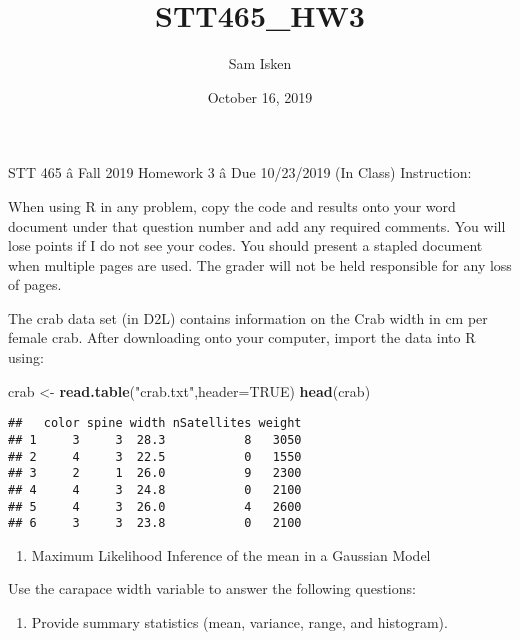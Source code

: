 \documentclass[]{article}
\title{STT465\_HW3}
\author{Sam Isken}
\date{October 16, 2019}
\newenvironment{Shaded}{\begin{snugshade}}{\end{snugshade}}
\newcommand{\KeywordTok}[1]{\textcolor[rgb]{0.13,0.29,0.53}{\textbf{#1}}}
\newcommand{\DataTypeTok}[1]{\textcolor[rgb]{0.13,0.29,0.53}{#1}}
\newcommand{\StringTok}[1]{\textcolor[rgb]{0.31,0.60,0.02}{#1}}
\newcommand{\OtherTok}[1]{\textcolor[rgb]{0.56,0.35,0.01}{#1}}
\newcommand{\NormalTok}[1]{#1}
\providecommand{\tightlist}{%
  \setlength{\itemsep}{0pt}\setlength{\parskip}{0pt}}
\begin{document}
\maketitle

STT 465 â Fall 2019 Homework 3 â Due 10/23/2019 (In Class)
Instruction:

When using R in any problem, copy the code and results onto your word
document under that question number and add any required comments. You
will lose points if I do not see your codes. You should present a
stapled document when multiple pages are used. The grader will not be
held responsible for any loss of pages.

The crab data set (in D2L) contains information on the Crab width in cm
per female crab. After downloading onto your computer, import the data
into R using:

\begin{Shaded}
\begin{Highlighting}[]
\NormalTok{crab <-}\StringTok{ }\KeywordTok{read.table}\NormalTok{(}\StringTok{"crab.txt"}\NormalTok{,}\DataTypeTok{header=}\OtherTok{TRUE}\NormalTok{)}
\KeywordTok{head}\NormalTok{(crab)}
\end{Highlighting}
\end{Shaded}

\begin{verbatim}
##   color spine width nSatellites weight
## 1     3     3  28.3           8   3050
## 2     4     3  22.5           0   1550
## 3     2     1  26.0           9   2300
## 4     4     3  24.8           0   2100
## 5     4     3  26.0           4   2600
## 6     3     3  23.8           0   2100
\end{verbatim}

\begin{enumerate}
\def\labelenumi{\arabic{enumi}.}
\tightlist
\item
  Maximum Likelihood Inference of the mean in a Gaussian Model
\end{enumerate}

Use the carapace width variable to answer the following questions:

\begin{enumerate}
\def\labelenumi{\alph{enumi})}
\tightlist
\item
  Provide summary statistics (mean, variance, range, and histogram).
\end{enumerate}
\end{document}
